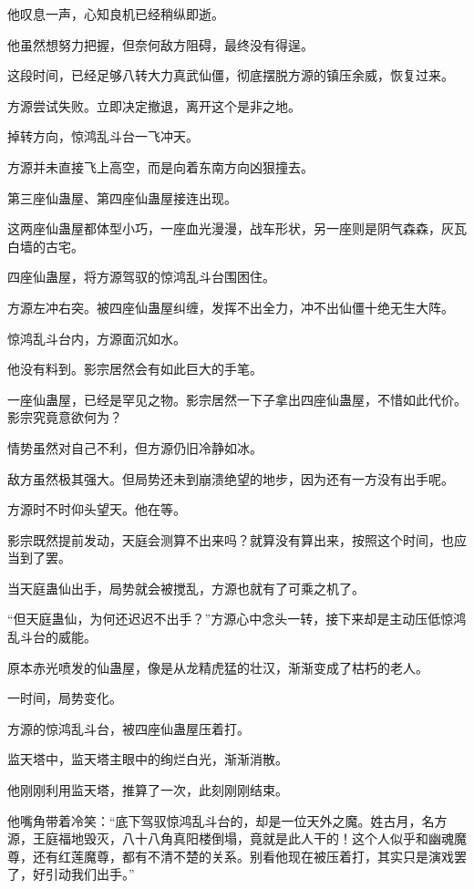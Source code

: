 \begin{this_body}
他叹息一声，心知良机已经稍纵即逝。

他虽然想努力把握，但奈何敌方阻碍，最终没有得逞。

这段时间，已经足够八转大力真武仙僵，彻底摆脱方源的镇压余威，恢复过来。

方源尝试失败。立即决定撤退，离开这个是非之地。

掉转方向，惊鸿乱斗台一飞冲天。

方源并未直接飞上高空，而是向着东南方向凶狠撞去。

第三座仙蛊屋、第四座仙蛊屋接连出现。

这两座仙蛊屋都体型小巧，一座血光漫漫，战车形状，另一座则是阴气森森，灰瓦白墙的古宅。

四座仙蛊屋，将方源驾驭的惊鸿乱斗台围困住。

方源左冲右突。被四座仙蛊屋纠缠，发挥不出全力，冲不出仙僵十绝无生大阵。

惊鸿乱斗台内，方源面沉如水。

他没有料到。影宗居然会有如此巨大的手笔。

一座仙蛊屋，已经是罕见之物。影宗居然一下子拿出四座仙蛊屋，不惜如此代价。影宗究竟意欲何为？

情势虽然对自己不利，但方源仍旧冷静如冰。

敌方虽然极其强大。但局势还未到崩溃绝望的地步，因为还有一方没有出手呢。

方源时不时仰头望天。他在等。

影宗既然提前发动，天庭会测算不出来吗？就算没有算出来，按照这个时间，也应当到了罢。

当天庭蛊仙出手，局势就会被搅乱，方源也就有了可乘之机了。

“但天庭蛊仙，为何还迟迟不出手？”方源心中念头一转，接下来却是主动压低惊鸿乱斗台的威能。

原本赤光喷发的仙蛊屋，像是从龙精虎猛的壮汉，渐渐变成了枯朽的老人。

一时间，局势变化。

方源的惊鸿乱斗台，被四座仙蛊屋压着打。

监天塔中，监天塔主眼中的绚烂白光，渐渐消散。

他刚刚利用监天塔，推算了一次，此刻刚刚结束。

他嘴角带着冷笑：“底下驾驭惊鸿乱斗台的，却是一位天外之魔。姓古月，名方源，王庭福地毁灭，八十八角真阳楼倒塌，竟就是此人干的！这个人似乎和幽魂魔尊，还有红莲魔尊，都有不清不楚的关系。别看他现在被压着打，其实只是演戏罢了，好引动我们出手。”


\end{this_body}
